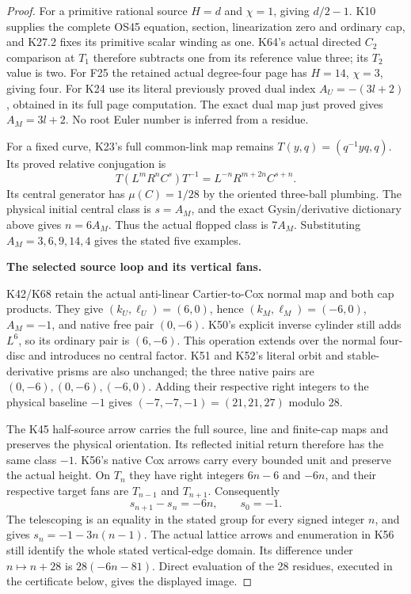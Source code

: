 \begin{proof}
For a primitive rational source \(H=d\) and \(\chi=1\), giving
\(d/2-1\). K10 supplies the complete OS45 equation, section,
linearization zero and ordinary cap, and K27.2 fixes its primitive
scalar winding as one. K64's actual directed \(C_2\) comparison at
\(T_1\) therefore subtracts one from its reference value three;
its \(T_2\) value is two. For F25 the retained actual degree-four
page has \(H=14\), \(\chi=3\), giving four. For K24 use its literal previously proved dual index \(A_U=-(3l+2)\), obtained in
its full page computation. The exact dual map just proved gives
\(A_M=3l+2\). No root Euler number is inferred from a residue.

For a fixed curve, K23's full common-link map remains
\(T(y,q)=(q^{-1}yq,q)\). Its proved relative conjugation is
\[
 T(L^mR^nC^s)T^{-1}=L^{-n}R^{m+2n}C^{s+n}.
\]
Its central generator has \(\mu(C)=1/28\) by the oriented
three-ball plumbing. The physical initial central class is
\(s=A_M\), and the exact Gysin/derivative dictionary above gives
\(n=6A_M\). Thus the actual flopped class is \(7A_M\).
Substituting \(A_M=3,6,9,14,4\) gives the stated five examples.

\par\medskip\noindent\textbf{The selected source loop and its vertical fans.}\par\nobreak
K42/K68 retain the actual anti-linear Cartier-to-Cox normal map and
both cap products. They give \((k_U,\ell_U)=(6,0)\), hence
\((k_M,\ell_M)=(-6,0)\), \(A_M=-1\), and native free pair
\((0,-6)\). K50's explicit inverse cylinder still adds \(L^6\),
so its ordinary pair is \((6,-6)\). This operation extends over the
normal four-disc and introduces no central factor. K51 and K52's
literal orbit and stable-derivative prisms are also unchanged; the
three native pairs are \((0,-6),(0,-6),(-6,0)\).
Adding their respective right integers to the physical baseline
\(-1\) gives \((-7,-7,-1)=(21,21,27)\) modulo 28.

The K45 half-source arrow carries the full source, line and finite-cap
maps and preserves the physical orientation. Its reflected initial
return therefore has the same class \(-1\). K56's native Cox arrows
carry every bounded unit and preserve the actual height. On \(T_n\)
they have right integers \(6n-6\) and \(-6n\), and their respective
target fans are \(T_{n-1}\) and \(T_{n+1}\). Consequently
\[
 s_{n+1}-s_n=-6n,\qquad s_0=-1.
\]
The telescoping is an equality in the stated group for every signed
integer \(n\), and gives \(s_n=-1-3n(n-1)\).
The actual lattice arrows and enumeration in K56 still identify the
whole stated vertical-edge domain. Its difference under \(n\mapsto
n+28\) is \(28(-6n-81)\). Direct evaluation of the 28 residues,
executed in the certificate below, gives the displayed image.


\end{proof}
